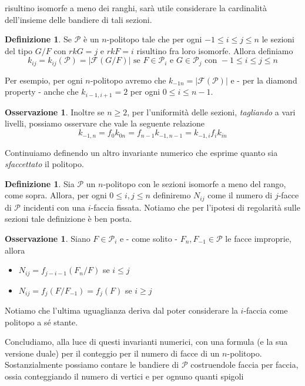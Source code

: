 \documentclass[a4paper,12pt]{report}
\newcommand{\p}{\mathcal{P}}
\theoremstyle{plain}
\theoremstyle{definition}
\newtheorem{defin}[teo]{Definizione}
\newtheorem{oss}[teo]{Osservazione}
\begin{document}
risultino isomorfe a meno dei ranghi, sar\`a utile considerare la cardinalit\`a dell'insieme delle bandiere di tali sezioni.
\begin{defin}
Se $\p$ \`e un $n$-politopo tale che per ogni $-1\leq i\leq j\leq n$ le sezioni del tipo $G/F$ con $rkG=j$ e $rkF=i$ risultino fra loro isomorfe.
Allora definiamo
\begin{equation}
k_{ij}=k_{ij}(\p)=\left|\mathcal{F}(G/F)\right|\text{ se }F\in\p_i\text{ e }G\in\p_j\text{ con }-1\leq i\leq j\leq n
\end{equation}
\end{defin}
Per esempio, per ogni $n$-politopo avremo che $k_{-1n}=\left|\mathcal{F}(\p)\right|$ e - per la diamond property - anche che
$k_{i-1,i+1}=2$ per ogni $0\leq i\leq n-1$.
\begin{oss}
Inoltre se $n\geq 2$, per l'uniformit\`a delle sezioni, \emph{tagliando} a vari livelli, possiamo osservare che vale la seguente relazione
\begin{equation}
\label{kijf}
k_{-1,n}=f_0k_{0n}=f_{n-1}k_{-1,n-1}=k_{-1,i}f_ik_{in}
\end{equation}
\end{oss}
Continuiamo definendo un altro invariante numerico che esprime quanto sia \emph{sfaccettato} il politopo.
\begin{defin}
Sia $\p$ un $n$-politopo con le sezioni isomorfe a meno del rango, come sopra. Allora, per ogni $0\leq i,j\leq n$ definiremo $N_{ij}$ come
il numero di $j$-facce di $\p$ incidenti con una $i$-faccia fissata.
Notiamo che per l'ipotesi di regolarit\`a sulle sezioni tale definizione \`e ben posta.
\end{defin}
\begin{oss}
Siano $F\in\p_i$ e - come solito - $F_n,F_{-1}\in\p$ le facce improprie, allora
\begin{itemize}
\item $N_{ij}=f_{j-i-1}(F_n/F)$ se $i\leq j$
\item $N_{ij}=f_j(F/F_{-1})=f_j(F)$ se $i\geq j$
\end{itemize}
Notiamo che l'ultima uguaglianza deriva dal poter considerare la $i$-faccia come politopo a s\'e stante.
\end{oss}
Concludiamo, alla luce di questi invarianti numerici, con una formula (e la sua versione duale) per il conteggio per il numero di facce di un $n$-politopo.
Sostanzialmente possiamo contare le bandiere di $\p$ costruendole faccia per faccia, ossia conteggiando il numero di vertici e per ognuno quanti spigoli
\end{document}
